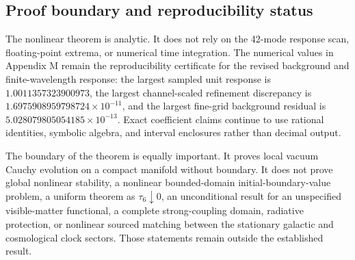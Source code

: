 \documentclass[aps,prd,reprint,onecolumn,notitlepage,nofootinbib,longbibliography,floatfix]{revtex4-2}
\theoremstyle{scstyle}
\theoremstyle{definition}
\theoremstyle{remark}
\begin{document}
\subsection{Proof boundary and reproducibility status}
The nonlinear theorem is analytic.  It does not rely on the 42-mode response scan, floating-point extrema, or numerical time integration.  The numerical values in Appendix M remain the reproducibility certificate for the revised background and finite-wavelength response: the largest sampled unit response is $1.0011357323900973$, the largest channel-scaled refinement discrepancy is $1.6975908959798724\times10^{-11}$, and the largest fine-grid background residual is $5.028079805054185\times10^{-13}$.  Exact coefficient claims continue to use rational identities, symbolic algebra, and interval enclosures rather than decimal output.

The boundary of the theorem is equally important.  It proves local vacuum Cauchy evolution on a compact manifold without boundary.  It does not prove global nonlinear stability, a nonlinear bounded-domain initial-boundary-value problem, a uniform theorem as $\tau_6\downarrow0$, an unconditional result for an unspecified visible-matter functional, a complete strong-coupling domain, radiative protection, or nonlinear sourced matching between the stationary galactic and cosmological clock sectors.  Those statements remain outside the established result.
\end{document}
